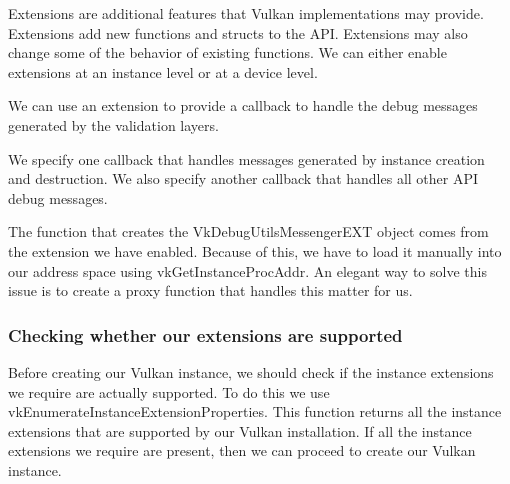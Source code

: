 Extensions are  additional features that Vulkan implementations may provide.
Extensions add new functions and structs to the API.
Extensions may also change some of the behavior of existing functions.
We can either enable extensions at an instance level or at a device level.

We can use an extension to provide a callback to handle the debug messages
generated by the validation layers.

\begin{minipage}{\linewidth}{\noindent}
    
\end{minipage}

We specify one callback that handles messages generated by
instance creation and destruction.
We also specify another callback that handles all other API debug messages.

\begin{minipage}{\linewidth}{\noindent}
    
\end{minipage}

The function that creates the VkDebugUtilsMessengerEXT object comes from the
extension we have enabled.
Because of this, we have to load it manually into our address space using
vkGetInstanceProcAddr.
An elegant way to solve this issue is to create a proxy function that handles
this matter for us.

\begin{minipage}{\linewidth}{\noindent}
    
\end{minipage}

\subsubsection{Checking whether our extensions are supported}

Before creating our Vulkan instance, we should check if the instance extensions
we require are actually supported.
To do this we use vkEnumerateInstanceExtensionProperties.
This function returns all the instance extensions that are supported by our
Vulkan installation.
If all the instance extensions we require are present, then we can proceed to
create our Vulkan instance.

